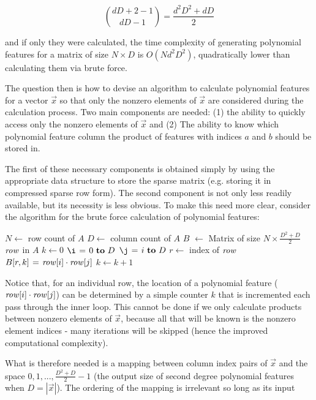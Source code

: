 \documentclass[11pt,twocolumn]{article}
\begin{document}
\begin{equation*}
\binom{dD+2-1}{dD-1} = \frac{d^2D^2+dD}{2}
\end{equation*}

and if only they were calculated, the time complexity of generating polynomial features
for a matrix of size $N \times D$ is $O(Nd^2D^2)$, quadratically lower than calculating them via brute force.

The question then is how to devise an algorithm to calculate polynomial features for a vector $\vec{x}$ so that
only the nonzero elements of $\vec{x}$ are considered during the calculation process. Two main components are needed: (1) the ability to
quickly access only the nonzero elements of $\vec{x}$ and (2) The ability to know which polynomial feature column
the product of features with indices $a$ and $b$ should be stored in.

The first of these necessary components is obtained simply by using the appropriate data structure
to store the sparse matrix (e.g. storing it in compressed sparse row form). The second component 
is not only less readily available, but its necessity is less obvious. To make this need more clear, consider the
algorithm for the brute force calculation of polynomial features:

\begin{codebox}
\footnotesize
{}
    \zi $N \gets$ row count of $A$
    \zi $D \gets$ column count of $A$
    \zi $B$ $\gets$ Matrix of size $N \times \frac{D^2+D}{2}$
    \zi \For $\id{row}$ in $A$ \Do
    \zi     $k \gets 0$
    \zi     \For $\i \gets 0 \To D$ \Do
    \zi         \For $\j \gets i \To D$ \Do
    \zi             $r \gets$ index of $\id{row}$
    \zi             $B[r, k] \gets \id{row}[i] \cdot \id{row}[j]$
    \zi             $k \gets k + 1$
                \End
            \End
       	\End
\end{codebox}

Notice that, for an individual row, the location of a polynomial feature ($\id{row}[i] \cdot \id{row}[j]$) can be determined
by a simple counter $k$ that is incremented each pass through the inner loop. This cannot be
done if we only calculate products between nonzero elements of $\vec{x}$, because all that
will be known is the nonzero element indices - many iterations will be skipped (hence the improved computational complexity).

What is therefore needed is a mapping between column index pairs of $\vec{x}$ and the space ${0, 1, ..., \frac{D^2+D}{2}-1}$
(the output size of second degree polynomial features when $D = |\vec{x}|$). The ordering of the mapping is irrelevant so long as its input 
\end{document}
